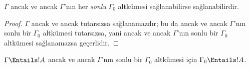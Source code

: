 \documentclass[../../../include/open-logic-section]{subfiles}
\begin{document}
\begin{prop}
$\Gamma$ ancak ve ancak $\Gamma$'nın her \emph{sonlu} $\Gamma_0$ altkümesi
sağlanabilirse sağlanabilirdir.
\end{prop}

\begin{proof}
$\Gamma$ ancak ve ancak tutarsızsa sağlanamazdır; bu da ancak ve ancak
$\Gamma$'nın sonlu bir $\Gamma_0$ altkümesi tutarsızsa, yani ancak ve ancak
$\Gamma$'nın sonlu bir $\Gamma_0$ altkümesi sağlanamazsa geçerlidir.
\end{proof}

\begin{cor}
$\Gamma \Entails !A$ ancak ve ancak $\Gamma$'nın sonlu bir $\Gamma_0$
altkümesi için $\Gamma_0 \Entails !A$.
\end{cor}
\end{document}
